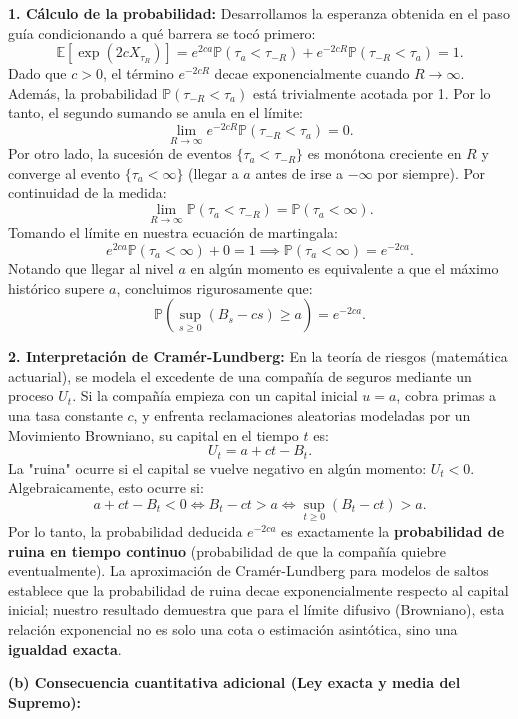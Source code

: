 \documentclass[11pt, letterpaper]{article}
\begin{document}
\begin{solucion}
    \textbf{1. Cálculo de la probabilidad:}
    Desarrollamos la esperanza obtenida en el paso guía condicionando a qué barrera se tocó primero:
    \[ \mathbb{E}[\exp(2c X_{\tau_R})] = e^{2ca} \mathbb{P}(\tau_a < \tau_{-R}) + e^{-2cR} \mathbb{P}(\tau_{-R} < \tau_a) = 1. \]
    Dado que $c > 0$, el término $e^{-2cR}$ decae exponencialmente cuando $R \to \infty$. Además, la probabilidad $\mathbb{P}(\tau_{-R} < \tau_a)$ está trivialmente acotada por 1. Por lo tanto, el segundo sumando se anula en el límite:
    \[ \lim_{R \to \infty} e^{-2cR} \mathbb{P}(\tau_{-R} < \tau_a) = 0. \]
    Por otro lado, la sucesión de eventos $\{\tau_a < \tau_{-R}\}$ es monótona creciente en $R$ y converge al evento $\{\tau_a < \infty\}$ (llegar a $a$ antes de irse a $-\infty$ por siempre). Por continuidad de la medida:
    \[ \lim_{R \to \infty} \mathbb{P}(\tau_a < \tau_{-R}) = \mathbb{P}(\tau_a < \infty). \]
    Tomando el límite en nuestra ecuación de martingala:
    \[ e^{2ca} \mathbb{P}(\tau_a < \infty) + 0 = 1 \implies \mathbb{P}(\tau_a < \infty) = e^{-2ca}. \]
    Notando que llegar al nivel $a$ en algún momento es equivalente a que el máximo histórico supere $a$, concluimos rigurosamente que:
    \[ \mathbb{P}\left(\sup_{s \ge 0}(B_s - cs) \ge a\right) = e^{-2ca}. \]

    \textbf{2. Interpretación de Cramér-Lundberg:}
    En la teoría de riesgos (matemática actuarial), se modela el excedente de una compañía de seguros mediante un proceso $U_t$. Si la compañía empieza con un capital inicial $u = a$, cobra primas a una tasa constante $c$, y enfrenta reclamaciones aleatorias modeladas por un Movimiento Browniano, su capital en el tiempo $t$ es:
    \[ U_t = a + ct - B_t. \]
    La "ruina" ocurre si el capital se vuelve negativo en algún momento: $U_t < 0$.
    Algebraicamente, esto ocurre si:
    \[ a + ct - B_t < 0 \iff B_t - ct > a \iff \sup_{t \ge 0} (B_t - ct) > a. \]
    Por lo tanto, la probabilidad deducida $e^{-2ca}$ es exactamente la \textbf{probabilidad de ruina en tiempo continuo} (probabilidad de que la compañía quiebre eventualmente). La aproximación de Cramér-Lundberg para modelos de saltos establece que la probabilidad de ruina decae exponencialmente respecto al capital inicial; nuestro resultado demuestra que para el límite difusivo (Browniano), esta relación exponencial no es solo una cota o estimación asintótica, sino una \textbf{igualdad exacta}.

    \vspace{3mm}
    \textbf{(b) Consecuencia cuantitativa adicional (Ley exacta y media del Supremo):}
    

\end{solucion}
\end{document}
